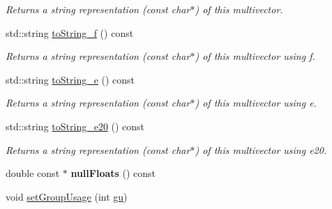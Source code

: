 \begin{DoxyCompactItemize}
\begin{DoxyCompactList}\small\item\em Returns a string representation (const char$\ast$) of this multivector. \end{DoxyCompactList}\item 
\hypertarget{classe3ga_1_1mv_adecde7bbd27a7bd8a630e2722f376bee}{std\-::string \hyperlink{classe3ga_1_1mv_adecde7bbd27a7bd8a630e2722f376bee}{to\-String\-\_\-f} () const }\label{classe3ga_1_1mv_adecde7bbd27a7bd8a630e2722f376bee}

\begin{DoxyCompactList}\small\item\em Returns a string representation (const char$\ast$) of this multivector using f. \end{DoxyCompactList}\item 
\hypertarget{classe3ga_1_1mv_ac5b8a902ac9072653fcde8aefd614d4f}{std\-::string \hyperlink{classe3ga_1_1mv_ac5b8a902ac9072653fcde8aefd614d4f}{to\-String\-\_\-e} () const }\label{classe3ga_1_1mv_ac5b8a902ac9072653fcde8aefd614d4f}

\begin{DoxyCompactList}\small\item\em Returns a string representation (const char$\ast$) of this multivector using e. \end{DoxyCompactList}\item 
\hypertarget{classe3ga_1_1mv_ae27cd17befd92074c7fac70693f073e8}{std\-::string \hyperlink{classe3ga_1_1mv_ae27cd17befd92074c7fac70693f073e8}{to\-String\-\_\-e20} () const }\label{classe3ga_1_1mv_ae27cd17befd92074c7fac70693f073e8}

\begin{DoxyCompactList}\small\item\em Returns a string representation (const char$\ast$) of this multivector using e20. \end{DoxyCompactList}\item 
\hypertarget{classe3ga_1_1mv_aa2ccb983e2b6498c3f84f1c7e0c7e797}{double const $\ast$ {\bfseries null\-Floats} () const }\label{classe3ga_1_1mv_aa2ccb983e2b6498c3f84f1c7e0c7e797}

\item 
\hypertarget{classe3ga_1_1mv_aa6f9ebadaf0a6a16dec87c3058dd5143}{void \hyperlink{classe3ga_1_1mv_aa6f9ebadaf0a6a16dec87c3058dd5143}{set\-Group\-Usage} (int \hyperlink{classe3ga_1_1mv_a66b360fa8609ea9243f1c92b33d8e102}{gu})}\label{classe3ga_1_1mv_aa6f9ebadaf0a6a16dec87c3058dd5143}


\end{DoxyCompactItemize}
